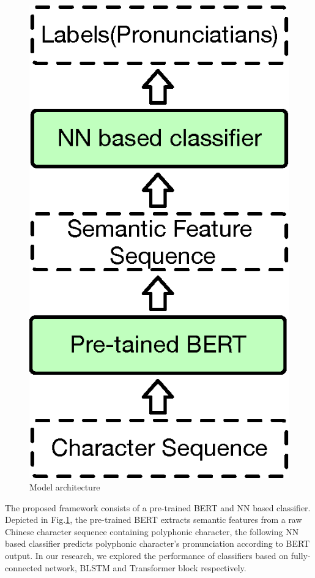 \documentclass[a4paper]{article}
\begin{document}
\begin{figure}[t]
	\centering
	\includegraphics[scale=0.35]{pics3/architecture2.eps}
	\caption{Model architecture}
	\label{fig:model_architecture}
\end{figure}

The proposed framework consists of a pre-trained BERT and NN based classifier. Depicted in  Fig.\ref{fig:model_architecture}, the pre-trained BERT extracts semantic features from a raw Chinese character sequence containing polyphonic character, the following NN based classifier predicts polyphonic character's pronunciation according to BERT output. In our research, we explored the performance of classifiers based on fully-connected network, BLSTM and Transformer block respectively.
\end{document}
